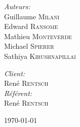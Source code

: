 \begin{titlepage}
\begin{center}
        \begin{minipage}{0.4\textwidth}
            \begin{flushleft} \large
                \emph{Auteurs:}\\
                Guillaume \textsc{Milani}\\
                Edward \textsc{Ransome}\\
                Mathieu \textsc{Monteverde}\\
                Michael \textsc{Spierer}\\
                Sathiya \textsc{Kirushnapillai}
            \end{flushleft}
        \end{minipage}
        \begin{minipage}{0.4\textwidth}
            \begin{flushright} \large
                \emph{Client:} \\
                René \textsc{Rentsch}\\
                \emph{Référent:} \\
                René \textsc{Rentsch}\\
            \end{flushright}
        \end{minipage}
        
        \vfill
        
        {\large \today}
        
    \end{center}
\end{titlepage}
